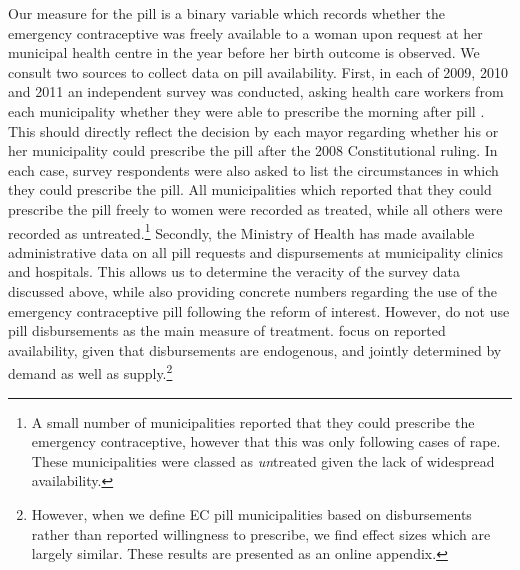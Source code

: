 
Our measure for the pill is a binary variable which records whether the 
emergency contraceptive was freely available to a woman upon request at her 
municipal health centre in the year before her birth outcome is observed.  We
consult two sources to collect data on pill availability.  First, in each of 
2009, 2010 and 2011 an independent survey was conducted, asking health care 
workers from each municipality whether they were able to prescribe the morning
after pill \citep{Didesetal2009,Didesetal2010,Didesetal2011}. This should 
directly reflect the decision by each mayor regarding whether his or her
municipality could prescribe the pill after the 2008 Constitutional ruling.  
In each case, survey respondents were also asked to list the circumstances in 
which they could prescribe the pill.  All municipalities which reported that
they could prescribe the pill freely to women were recorded as treated, while 
all others were recorded as untreated.\footnote{A small number of 
municipalities reported that they could prescribe the emergency contraceptive, 
however that this was only following cases of rape.  These municipalities were 
classed as \emph{un}treated given the lack of widespread availability.}  
Secondly, the Ministry of Health has made available administrative data on 
all pill requests and dispursements at municipality clinics and hospitals.  This
allows us to determine the veracity of the survey data discussed above, 
while also providing concrete numbers regarding the use of the emergency 
contraceptive pill following the reform of interest.  However, \person do not
use pill disbursements as the main measure of treatment.  \Person focus on
reported availability, given that disbursements are endogenous, and jointly
determined by demand as well as supply.\footnote{However, when we define EC
pill municipalities based on disbursements rather than reported willingness 
to prescribe, we find effect sizes which are largely similar.  These results
are presented as an online appendix.}

